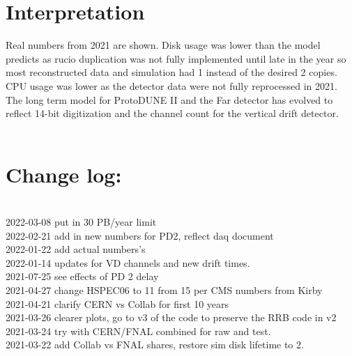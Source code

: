 \documentclass[12pt]{article}
\begin{document}
\pagebreak\section*{Interpretation} Real numbers from 2021 are shown. Disk usage was lower than the model predicts as rucio duplication was not fully implemented until late in the year so most  reconstructed data and simulation  had 1 instead of the desired 2 copies. CPU usage was lower as the detector data were not fully reprocessed in 2021. \\The long term model for ProtoDUNE II and the Far detector has evolved to reflect 14-bit digitization and the channel count for the vertical drift detector.\pagebreak \\
\\ {\section*{Change log:}}\\
2022-03-08 put in 30 PB/year limit\\2022-02-21 add in new numbers for PD2, reflect daq document\\2022-01-22 add actual numbers's\\2022-01-14 updates for VD channels and new drift times.\\2021-07-25 see effects of PD 2 delay\\2021-04-27 change HSPEC06 to 11 from 15 per CMS numbers from Kirby\\2021-04-21 clarify CERN vs Collab for first 10 years\\2021-03-26 clearer plots, go to v3 of the code to preserve the RRB code in v2\\2021-03-24 try with CERN/FNAL combined for raw and test.\\2021-03-22 add Collab vs FNAL shares, restore sim disk lifetime to 2.\\
\end{document}
